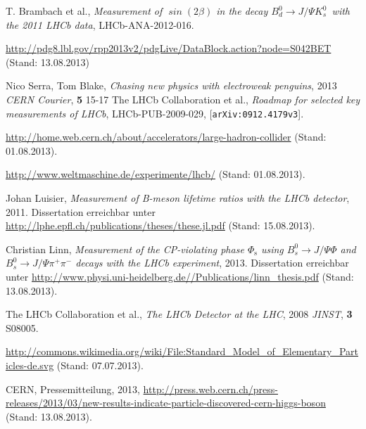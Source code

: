 \documentclass[ a4paper,
                12pt, 
                twoside, 
                chapterprefix,
                BCOR=10mm,
                bibtotoc, 
              ]{scrreprt}
\newcommand{\Decaychannel}{$B_d^0 \rightarrow J/\Psi K_s^0$}
\begin{document}

\pagestyle{headings}
\recalctypearea
\tableofcontents









\begin{thebibliography}{---}
 T. Brambach et al., \textit{Measurement of $\mathit{\sin(2\beta)}$ in the decay \Decaychannel\ with the 2011 LHCb data}, LHCb-ANA-2012-016.

 \url{http://pdg8.lbl.gov/rpp2013v2/pdgLive/DataBlock.action?node=S042BET} (Stand: 13.08.2013)

 Nico Serra, Tom Blake, \textit{Chasing new physics with electroweak penguins}, 2013 \textit{CERN Courier}, \textbf{5} 15-17 
 The LHCb Collaboration et al., \textit{Roadmap for selected key measurements of LHCb}, LHCb-PUB-2009-029, [\texttt{arXiv:0912.4179v3}]. 

 \url{http://home.web.cern.ch/about/accelerators/large-hadron-collider} (Stand: 01.08.2013).

 \url{http://www.weltmaschine.de/experimente/lhcb/} (Stand: 01.08.2013).

 Johan Luisier, \textit{Measurement of B-meson lifetime ratios with the LHCb detector}, 2011. Dissertation erreichbar unter \url{http://lphe.epfl.ch/publications/theses/these.jl.pdf} (Stand: 15.08.2013).

 Christian Linn, \textit{Measurement of the CP-violating phase $\Phi_{\text{s}}$ using $B_s^0 \rightarrow J/\Psi\Phi$ and $B_s^0 \rightarrow J/\Psi\pi^+\pi^-$ decays with the LHCb experiment}, 2013. Dissertation erreichbar unter \url{http://www.physi.uni-heidelberg.de//Publications/linn_thesis.pdf} (Stand: 13.08.2013).

 The LHCb Collaboration et al., \textit{The LHCb Detector at the LHC}, 2008 \textit{JINST}, \textbf{3} S08005.

 \url{http://commons.wikimedia.org/wiki/File:Standard_Model_of_Elementary_Particles-de.svg} (Stand: 07.07.2013).

 CERN, Pressemitteilung, 2013, \url{http://press.web.cern.ch/press-releases/2013/03/new-results-indicate-particle-discovered-cern-higgs-boson} (Stand: 13.08.2013).


\end{thebibliography}
\end{document}
